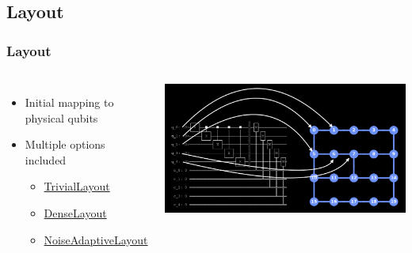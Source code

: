 \documentclass[aspectratio=169,11pt,hyperref={colorlinks=true}]{beamer}
\begin{document}
\subsection{Layout}
\begin{frame}
    \frametitle{Layout}
    \begin{columns}
            \begin{itemize}
                \item Initial mapping to physical qubits
                \item Multiple options included
                    \begin{itemize}
                        \item \href{https://github.com/Qiskit/qiskit-terra/blob/master/qiskit/transpiler/passes/layout/trivial\_layout.py}{TrivialLayout}
                        \item \href{https://github.com/Qiskit/qiskit-terra/blob/master/qiskit/transpiler/passes/layout/dense\_layout.py}{DenseLayout}
                        \item \href{https://github.com/Qiskit/qiskit-terra/blob/master/qiskit/transpiler/passes/layout/noise\_adaptive\_layout.py}{NoiseAdaptiveLayout}
                    \end{itemize}
            \end{itemize}
            \centering
            \includegraphics[width=1.1\textwidth]{layout.png}
    \end{columns}
\end{frame}
\end{document}
